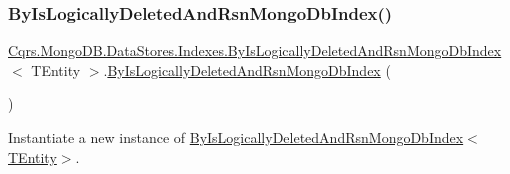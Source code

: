 \subsubsection{\texorpdfstring{By\+Is\+Logically\+Deleted\+And\+Rsn\+Mongo\+Db\+Index()}{ByIsLogicallyDeletedAndRsnMongoDbIndex()}}
{\footnotesize\ttfamily \hyperlink{classCqrs_1_1MongoDB_1_1DataStores_1_1Indexes_1_1ByIsLogicallyDeletedAndRsnMongoDbIndex}{Cqrs.\+Mongo\+D\+B.\+Data\+Stores.\+Indexes.\+By\+Is\+Logically\+Deleted\+And\+Rsn\+Mongo\+Db\+Index}$<$ T\+Entity $>$.\hyperlink{classCqrs_1_1MongoDB_1_1DataStores_1_1Indexes_1_1ByIsLogicallyDeletedAndRsnMongoDbIndex}{By\+Is\+Logically\+Deleted\+And\+Rsn\+Mongo\+Db\+Index} (\begin{DoxyParamCaption}{ }\end{DoxyParamCaption})\hspace{0.3cm}{\ttfamily [protected]}}



Instantiate a new instance of \hyperlink{classCqrs_1_1MongoDB_1_1DataStores_1_1Indexes_1_1ByIsLogicallyDeletedAndRsnMongoDbIndex_add37df2db333254d1489f13cd9a668a1_add37df2db333254d1489f13cd9a668a1}{By\+Is\+Logically\+Deleted\+And\+Rsn\+Mongo\+Db\+Index$<$\+T\+Entity$>$}. 

